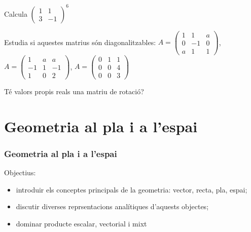 \documentclass{beamer}
\begin{document}
\begin{frame}

  \begin{exercici}{}
    Calcula $\begin{pmatrix}1&1\\3&-1\end{pmatrix}^6$
  \end{exercici}

  \begin{exercici}{}
    Estudia si aquestes matrius són diagonalitzables:
    $A=\begin{pmatrix}1&1&a\\0&-1&0\\a&1&1\end{pmatrix}$, $A=\begin{pmatrix}1&a&a\\-1&1&-1\\1&0&2\end{pmatrix}$,
    $A=\begin{pmatrix}0&1&1\\0&0&4\\0&0&3\end{pmatrix}$
  \end{exercici}

  \begin{exercici}{}
    Té valors propis reals una matriu de rotació?
  \end{exercici}

\end{frame}
\section{Geometria al pla i a l'espai}
\begin{frame}
  \frametitle{Geometria al pla i a l'espai}
  Objectius:
  \begin{itemize}
    \item introduir els conceptes principals de la geometria: vector, recta, pla, espai;
    \item discutir diverses reprsentacions analítiques d'aquests objectes;
    \item dominar producte escalar, vectorial i mixt
  \end{itemize}
\end{frame}
\end{document}
